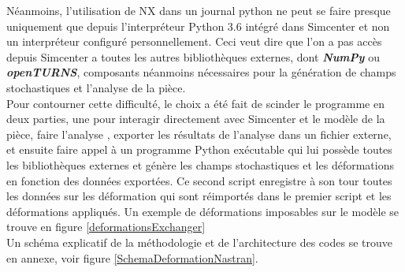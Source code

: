 \documentclass[a4paper,10pt]{article}
\begin{document}
Néanmoins, l'utilisation de NX dans un journal python ne peut se faire presque uniquement que depuis l’interpréteur Python 3.6 intégré dans Simcenter et non un interpréteur configuré personnellement. Ceci veut dire que l'on a pas accès depuis Simcenter a toutes les autres bibliothèques externes, dont \textit{\textbf{NumPy}} ou \textit{\textbf{openTURNS}}, composants néanmoins nécessaires pour la génération de champs stochastiques et l'analyse de la pièce. \\

Pour contourner cette difficulté, le choix a été fait de scinder le programme en deux parties, une pour interagir directement avec Simcenter et le modèle de la pièce, faire l'analyse , exporter les résultats de l'analyse dans un fichier externe, et ensuite faire appel à un programme Python exécutable qui lui possède toutes les bibliothèques externes et génère les champs stochastiques et les déformations en fonction des données exportées. Ce second script enregistre à son tour toutes les données sur les déformation qui sont réimportés dans le premier script et les déformations appliqués. Un exemple de déformations imposables sur le modèle se trouve en figure \ref{deformationsExchanger}\\

Un schéma explicatif de la méthodologie et de l'architecture des codes se trouve en annexe, voir figure \ref{SchemaDeformationNastran}. \\
\end{document}
